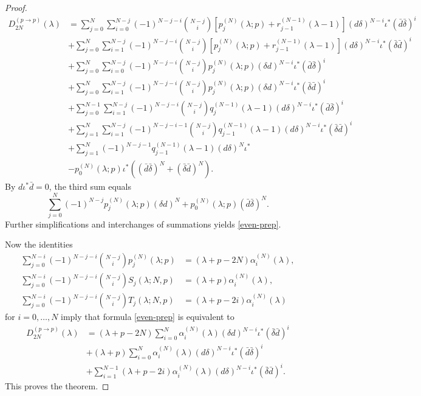 \documentclass[a4paper,12pt,reqno]{amsart}
\numberwithin{theorem}{subsection}
\numberwithin{equation}{section}
\begin{document}
\begin{proof}
\begin{align*}
   D_{2N}^{(p \to p)}(\lambda) & = \sum_{j=0}^{N} \sum_{i=0}^{N-j} (-1)^{N-j-i} \binom{N-j}{i}
   \left[ p_j^{(N)}(\lambda;p) + r_{j-1}^{(N-1)}(\lambda\!-\!1) \right]
   ({d} \delta)^{N-i}\iota^*(\bar{d} \bar{\delta})^{i} \\
   & + \sum_{j=0}^N \sum_{i=1}^{N-j} (-1)^{N-j-i} \binom{N-j}{i}
   \left[p_j^{(N)}(\lambda;p) + r_{j-1}^{(N-1)}(\lambda\!-\!1)\right]
   ({d} \delta)^{N-i} \iota^*(\bar{\delta} \bar{d})^{i} \\
   & + \sum_{j=0}^N \sum_{i=0}^{N-j} (-1)^{N-j-i} \binom{N-j}{i}
   p_j^{(N)}(\lambda;p) (\delta {d})^{N-i} \iota^*(\bar{d}\bar{\delta})^i \\
   & + \sum_{j=0}^N \sum_{i=1}^{N-j} (-1)^{N-j-i} \binom{N-j}{i}
   p_j^{(N)}(\lambda;p) (\delta {d})^{N-i} \iota^*(\bar{\delta}\bar{d})^{i} \\
   & + \sum_{j=0}^{N-1} \sum_{i=1}^{N-j} (-1)^{N-j-i} \binom{N-j}{i}
   q_{j}^{(N-1)}(\lambda\!-\!1) ({d} \delta)^{N-i} \iota^*(\bar{d}\bar{\delta})^{i}\\
   & + \sum_{j=1}^{N} \sum_{i=1}^{N-j}(-1)^{N-j-i-1} \binom{N-j}{i}
   q_{j-1}^{(N-1)}(\lambda\!-\!1) ({d} \delta)^{N-i} \iota^*(\bar{\delta}
   \bar{d})^i \\
   & + \sum_{j=1}^N (-1)^{N-j-1} q_{j-1}^{(N-1)}(\lambda\!-\!1) ({d} \delta)^N
   \iota^* \\
   & - p_0^{(N)}(\lambda;p) \iota^* ((\bar{d} \bar{\delta})^N + (\bar{\delta} \bar{d})^N).
\end{align*}
By ${d} \iota^* \bar{d} = 0$, the third sum equals
$$
   \sum_{j=0}^N (-1)^{N-j} p_j^{(N)}(\lambda;p) (\delta {d})^{N} + p_0^{(N)}(\lambda;p) (\bar{d} \bar{\delta})^N.
$$
Further simplifications and interchanges of summations yields
\eqref{even-prep}.

Now the identities
\begin{align}
   \sum_{j=0}^{N-i} (-1)^{N-j-i} \binom{N-j}{i} p_j^{(N)}(\lambda;p)
   & = (\lambda\!+\!p\!-\!2N) \alpha_i^{(N)}(\lambda), \label{id-1} \\
   \sum_{j=0}^{N-i} (-1)^{N-j-i} \binom{N-j}{i} S_j(\lambda;N,p)
   & = (\lambda\!+\!p) \alpha_i^{(N)}(\lambda), \label{id-2} \\
   \sum_{j=0}^{N-i} (-1)^{N-j-i}
   \binom{N-j}{i}  T_j(\lambda;N,p) & = (\lambda\!+\!p\!-\!2i) \alpha_i^{(N)}(\lambda) \label{id-3}
\end{align}
for $i=0,\dots,N$ imply that formula \eqref{even-prep} is equivalent to
\begin{align*}
   D_{2N}^{(p \to p)}(\lambda)
   & = (\lambda\!+\!p\!-\!2N) \sum_{i=0}^N \alpha_i^{(N)}(\lambda) (\delta{d})^{N-i} \iota^* (\bar{\delta}\bar{d})^i \\
   & + (\lambda\!+\!p) \sum_{i=0}^N
   \alpha_i^{(N)}(\lambda) ({d}\delta)^{N-i} \iota^* (\bar{d}\bar{\delta})^{i} \\
   & + \sum_{i=1}^{N-1} (\lambda\!+\!p\!-\!2i) \alpha_i^{(N)}(\lambda) ({d}\delta)^{N-i} \iota^*
   (\bar{\delta}\bar{d})^{i}.
\end{align*}
This proves the theorem.


\end{proof}
\end{document}
